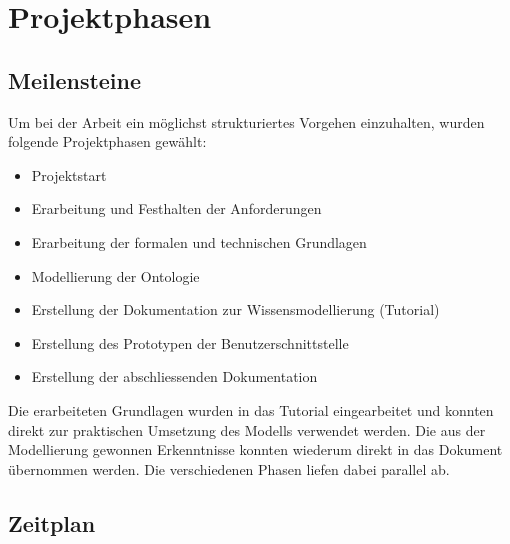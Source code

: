 \section{Projektphasen}
\label{sec:projektphasen}

\subsection{Meilensteine}
\label{subsec:vorgehen_projektphasen_meilensteine}
Um bei der Arbeit ein möglichst strukturiertes Vorgehen einzuhalten, wurden folgende Projektphasen gewählt:
\begin{itemize}
    \item Projektstart
    \item Erarbeitung und Festhalten der Anforderungen
    \item Erarbeitung der formalen und technischen Grundlagen
    \item Modellierung der Ontologie
    \item Erstellung der Dokumentation zur Wissensmodellierung (Tutorial)
    \item Erstellung des Prototypen der Benutzerschnittstelle
    \item Erstellung der abschliessenden Dokumentation
\end{itemize}

Die erarbeiteten Grundlagen wurden in das Tutorial eingearbeitet und konnten direkt zur praktischen Umsetzung des Modells verwendet werden. Die aus der Modellierung gewonnen Erkenntnisse konnten wiederum direkt in das Dokument übernommen werden. Die verschiedenen Phasen liefen dabei parallel ab.

\subsection{Zeitplan}
\label{subsec:vorgehen_projektphasen_zeitplan}

